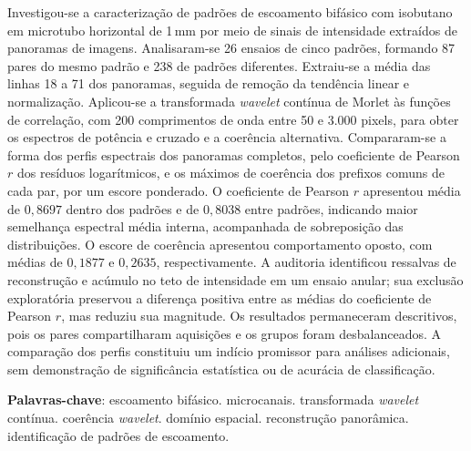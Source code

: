 \setlength{\absparsep}{18pt} %
\begin{resumo}
Investigou-se a caracterização de padrões de escoamento bifásico com isobutano em
microtubo horizontal de 1\,mm por meio de sinais de intensidade extraídos de panoramas
de imagens. Analisaram-se 26 ensaios de cinco padrões, formando 87 pares do mesmo padrão
e 238 de padrões diferentes. Extraiu-se a média das linhas 18 a 71 dos panoramas,
seguida de remoção da tendência linear e normalização. Aplicou-se a transformada
\textit{wavelet} contínua de Morlet às funções de correlação, com 200 comprimentos de onda
entre 50 e 3.000 pixels, para obter os espectros de potência e cruzado e a coerência
alternativa. Compararam-se a forma dos perfis espectrais dos panoramas completos, pelo
coeficiente de Pearson $r$ dos resíduos logarítmicos, e os máximos de coerência dos
prefixos comuns de cada par, por um escore ponderado. O coeficiente de Pearson $r$
apresentou média de $0{,}8697$ dentro dos padrões e de $0{,}8038$ entre padrões,
indicando maior semelhança espectral média interna, acompanhada de sobreposição das
distribuições. O escore de coerência apresentou comportamento oposto, com médias de
$0{,}1877$ e $0{,}2635$, respectivamente. A auditoria identificou ressalvas de reconstrução
e acúmulo no teto de intensidade em um ensaio anular; sua exclusão exploratória preservou a diferença positiva
entre as médias do coeficiente de Pearson $r$, mas reduziu sua magnitude. Os resultados
permaneceram descritivos, pois os pares compartilharam aquisições e os grupos foram
desbalanceados. A comparação dos perfis constituiu um indício promissor para análises
adicionais, sem demonstração de significância estatística ou de acurácia de classificação.

 \textbf{Palavras-chave}: escoamento bifásico. microcanais. transformada \textit{wavelet} contínua. coerência \textit{wavelet}. domínio espacial. reconstrução panorâmica. identificação de padrões de escoamento.
\end{resumo}


